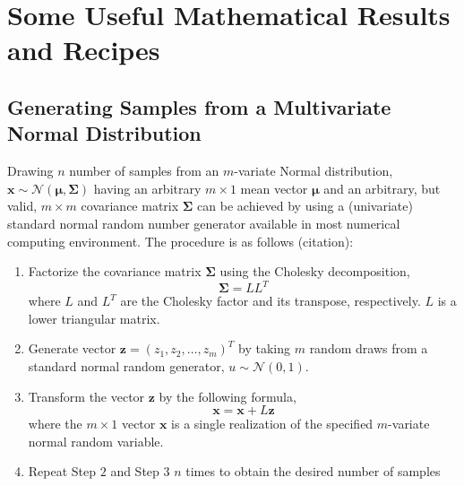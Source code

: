 \chapter{Some Useful Mathematical Results and Recipes}\label{app:math_results}

\section{Generating Samples from a Multivariate Normal Distribution}

Drawing $n$ number of samples from an $m$-variate Normal distribution, $\boldsymbol{x} \sim \mathcal{N}(\boldsymbol{\mu}, \boldsymbol{\Sigma})$ having an arbitrary $m \times 1$ mean vector $\boldsymbol{\mu}$ and an arbitrary, but valid, $m \times m$ covariance matrix $\boldsymbol{\Sigma}$ can be achieved by using a (univariate) standard normal random number generator available in most numerical computing environment.
The procedure is as follows (citation):

\begin{enumerate}
	\item Factorize the covariance matrix $\boldsymbol{\Sigma}$ using the Cholesky decomposition,
	\begin{equation}
	\boldsymbol{\Sigma} = L L^T
	\end{equation}
	where $L$ and $L^T$ are the Cholesky factor and its transpose, respectively. $L$ is a lower triangular matrix.
	
	\item Generate vector $\mathbf{z}=(z_1, z_2, \dots, z_m)^T$ by taking $m$ random draws from a standard normal random generator, $u \sim \mathcal{N}(0, 1)$.
	
	\item Transform the vector $\mathbf{z}$ by the following formula,
	\begin{equation}
	\mathbf{x} = \boldsymbol{x} + L \boldsymbol{z}
	\end{equation}
	where the $m \times 1$ vector $\mathbf{x}$ is a single realization of the specified $m$-variate normal random variable.
	
	\item Repeat Step $2$ and Step $3$ $n$ times to obtain the desired number of samples 
\end{enumerate}